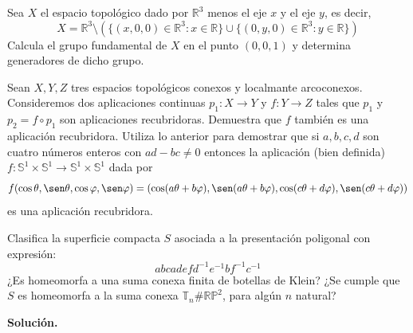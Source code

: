 \documentclass[12pt]{article}
\begin{document}
    \begin{ejercicio}
        Sea $X$ el espacio topológico dado por $\mathbb{R}^3$ menos el eje $x$ y el eje $y$, es decir,
        \begin{equation*}
            X = \mathbb{R}^3\setminus\left( \{(x,0,0)\in \mathbb{R}^3 : x\in \mathbb{R}\}\cup \{(0,y,0)\in \mathbb{R}^3 : y\in \mathbb{R}\}\right)
        \end{equation*}
        Calcula el grupo fundamental de $X$ en el punto $(0,0,1)$ y determina generadores de dicho grupo.
    \end{ejercicio}

    \begin{ejercicio}
        Sean $X,Y,Z$ tres espacios topológicos conexos y localmante arcoconexos. Consideremos dos aplicaciones continuas $p_1:X\to Y$ y $f:Y\to Z$ tales que $p_1$ y $p_2=f\circ p_1$ son aplicaciones recubridoras. Demuestra que $f$ también es una aplicación recubridora.\newline
        Utiliza lo anterior para demostrar que si $a,b,c,d$ son cuatro números enteros con $ad-bc\neq 0$ entonces la aplicación (bien definida) $f:\mathbb{S}^1\times \mathbb{S}^1\to \mathbb{S}^1\times \mathbb{S}^1$ dada por
        \begin{equation*}
            f(\cos\theta,\sen\theta,\cos\varphi,\sen\varphi) = (\cos(a\theta + b\varphi), \sen(a\theta + b\varphi), \cos(c\theta + d\varphi), \sen(c\theta + d\varphi))
        \end{equation*}
        es una aplicación recubridora.
    \end{ejercicio}

    \begin{ejercicio}
        Clasifica la superficie compacta $S$ asociada a la presentación poligonal con expresión:
        \begin{equation*}
            abcadefd^{-1}e^{-1}bf^{-1}c^{-1}
        \end{equation*}
        ¿Es homeomorfa a una suma conexa finita de botellas de Klein? ¿Se cumple que $S$ es homeomorfa a la suma conexa $\mathbb{T}_n\# \mathbb{R}\mathbb{P}^2$, para algún $n$ natural?
    \end{ejercicio}
    
    \newpage
    \setcounter{ejercicio}{0}
    \noindent
    \textbf{Solución.}
\end{document}
